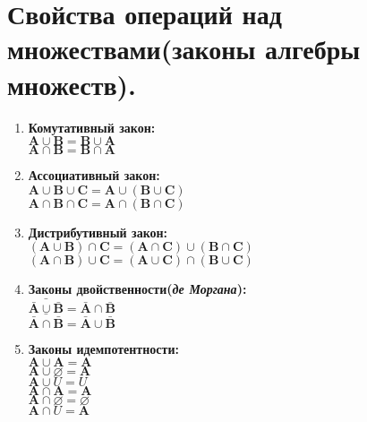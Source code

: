 \documentclass[12pt, a4paper, oneside]{article}
\theoremstyle{plain} %
\theoremstyle{definition}
\begin{document}
\section{Свойства операций над множествами(законы алгебры множеств).} 
\begin{enumerate}
    
    \item \textbf{Комутативный закон:}\\
    \(\textbf{A} \cup \textbf{B} = \textbf{B} \cup \textbf{A}\) \\
    \(\textbf{A} \cap \textbf{B} = \textbf{B} \cap \textbf{A}\)
    
    \item \textbf{Ассоциативный закон:}\\
    \(\textbf{A} \cup \textbf{B} \cup \textbf{C} = \textbf{A} \cup (\textbf{B} \cup \textbf{C})\) \\
     \(\textbf{A} \cap \textbf{B} \cap \textbf{C} = \textbf{A} \cap (\textbf{B} \cap \textbf{C})\)
     
     \item \textbf{Дистрибутивный закон:}\\
     \((\textbf{A} \cup \textbf{B}) \cap \textbf{C} = (\textbf{A} \cap \textbf{C}) \cup (\textbf{B} \cap \textbf{C})\) \\
     \((\textbf{A} \cap \textbf{B}) \cup \textbf{C} = (\textbf{A} \cup \textbf{C}) \cap (\textbf{B} \cup \textbf{C})\)
     
     \item \textbf{Законы двойственности(\emph{де Моргана}):}\\
     \(\bar{\bar{\textbf{A}} \cup \bar{\textbf{B}}} = \bar{\textbf{A}} \cap \bar{\textbf{B}} \) \\
     \(\bar{\bar{\textbf{A}} \cap \bar{\textbf{B}}} = \bar{\textbf{A}} \cup \bar{\textbf{B}} \)
    
     \item \textbf{Законы идемпотентности:} \\
     \(\textbf{A} \cup \textbf{A} = \textbf{A}\) \\
     \(\textbf{A} \cup \varnothing = \textbf{A}\) \\
     \(\textbf{A} \cup U = U\) \\
     \(\textbf{A} \cap \textbf{A} = \textbf{A}\) \\
     \(\textbf{A} \cap \varnothing = \varnothing\) \\
     \(\textbf{A} \cap U = \textbf{A}\)
    

\end{enumerate}
\end{document}
